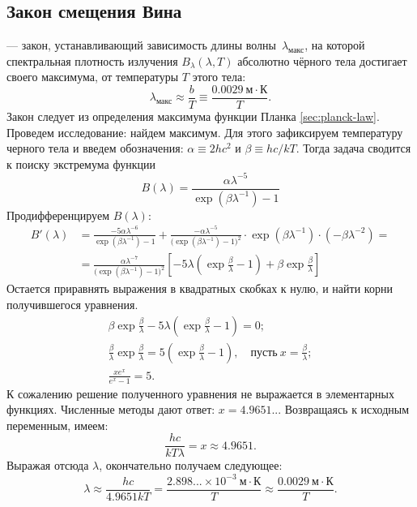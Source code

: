 \subsection{Закон смещения Вина}
 --- закон, устанавливающий зависимость длины волны~$\lambda_\text{макс}$, на которой спектральная плотность излучения $B_\lambda(\lambda, T)$ абсолютно чёрного тела достигает своего максимума, от температуры $T$ этого тела:
\begin{equation}
	\lambda_\text{макс} \approx \frac{b}{T} \equiv \frac{0.0029~\text{м} \cdot \text{К}}{T}.
\end{equation}
Закон следует из определения максимума функции Планка \eqref{sec:planck-law}.
Проведем исследование: найдем максимум. Для этого зафиксируем температуру черного тела и введем обозначения: $\alpha \equiv 2 h c^2$ и $\beta \equiv h c / k T$. Тогда задача сводится к поиску экстремума функции
\begin{equation*}
	B(\lambda) = \frac{\alpha \lambda^{-5}}{\exp \left(\beta \lambda^{-1} \right) - 1}
\end{equation*}
Продифференцируем $B(\lambda)$:
\begin{align*}
	B'(\lambda) &= \frac{-5 \alpha \lambda^{-6}}{\exp \left(\beta \lambda^{-1} \right) - 1} + \frac{-\alpha \lambda^{-5}}{\big(\exp \left(\beta \lambda^{-1} \right) - 1\big)^2} \cdot \exp \left( \beta \lambda^{-1} \right) \cdot \left(-\beta \lambda^{-2}\right) = \\
	&= \frac{\alpha \lambda^{-7}}{\big(\exp \left(\beta \lambda^{-1} \right) - 1\big)^2} \left[ -5\lambda \left( \exp \frac{\beta}{\lambda} - 1 \right) + \beta \exp \frac{\beta}{\lambda} \right]
\end{align*}
Остается приравнять выражения в квадратных скобках к нулю, и найти корни получившегося уравнения.
\begin{gather*}
	\beta \exp \frac{\beta}{\lambda} - 5\lambda \left( \exp \frac{\beta}{\lambda} - 1 \right) = 0;\\
	\frac{\beta}{\lambda} \exp \frac{\beta}{\lambda} = 5 \left( \exp \frac{\beta}{\lambda} - 1 \right),\quad\text{пусть}~x = \frac{\beta}{\lambda};\\
	\frac{x e^x}{e^x - 1} = 5.
\end{gather*}
К сожалению решение полученного уравнения не выражается в элементарных функциях. Численные методы дают ответ: $x = 4.9651...$ Возвращаясь к исходным переменным, имеем:
\begin{equation*}
	\frac{h c}{k T \lambda} = x \approx 4.9651.
\end{equation*}
Выражая отсюда $\lambda$, окончательно получаем следующее:
\begin{equation*}
	\lambda \approx \frac{h c}{4.9651 k T} = \frac{2.898... \times 10^{-3}~\text{м}\cdot\text{К}}{T} \approx  \frac{0.0029~\text{м} \cdot \text{К}}{T}.
\end{equation*}

